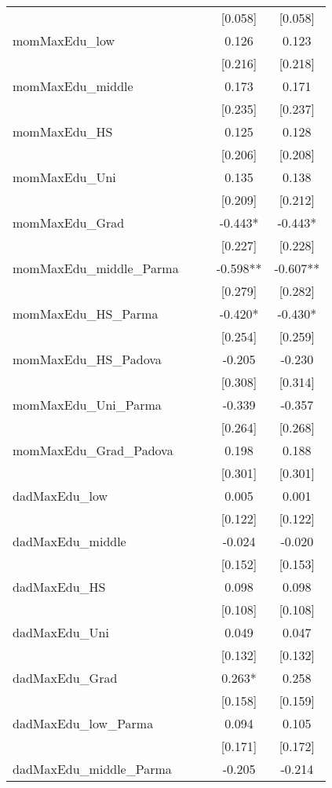 \documentclass[]{article}
\begin{document}
\begin{tabular}{lcccc}
 &  &  & [0.058] & [0.058] \\
momMaxEdu\_low &  &  & 0.126 & 0.123 \\
 &  &  & [0.216] & [0.218] \\
momMaxEdu\_middle &  &  & 0.173 & 0.171 \\
 &  &  & [0.235] & [0.237] \\
momMaxEdu\_HS &  &  & 0.125 & 0.128 \\
 &  &  & [0.206] & [0.208] \\
momMaxEdu\_Uni &  &  & 0.135 & 0.138 \\
 &  &  & [0.209] & [0.212] \\
momMaxEdu\_Grad &  &  & -0.443* & -0.443* \\
 &  &  & [0.227] & [0.228] \\
momMaxEdu\_middle\_Parma &  &  & -0.598** & -0.607** \\
 &  &  & [0.279] & [0.282] \\
momMaxEdu\_HS\_Parma &  &  & -0.420* & -0.430* \\
 &  &  & [0.254] & [0.259] \\
momMaxEdu\_HS\_Padova &  &  & -0.205 & -0.230 \\
 &  &  & [0.308] & [0.314] \\
momMaxEdu\_Uni\_Parma &  &  & -0.339 & -0.357 \\
 &  &  & [0.264] & [0.268] \\
momMaxEdu\_Grad\_Padova &  &  & 0.198 & 0.188 \\
 &  &  & [0.301] & [0.301] \\
dadMaxEdu\_low &  &  & 0.005 & 0.001 \\
 &  &  & [0.122] & [0.122] \\
dadMaxEdu\_middle &  &  & -0.024 & -0.020 \\
 &  &  & [0.152] & [0.153] \\
dadMaxEdu\_HS &  &  & 0.098 & 0.098 \\
 &  &  & [0.108] & [0.108] \\
dadMaxEdu\_Uni &  &  & 0.049 & 0.047 \\
 &  &  & [0.132] & [0.132] \\
dadMaxEdu\_Grad &  &  & 0.263* & 0.258 \\
 &  &  & [0.158] & [0.159] \\
dadMaxEdu\_low\_Parma &  &  & 0.094 & 0.105 \\
 &  &  & [0.171] & [0.172] \\
dadMaxEdu\_middle\_Parma &  &  & -0.205 & -0.214 \\

\end{tabular}
\end{document}
